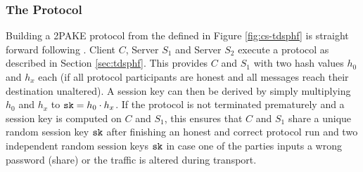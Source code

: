 \subsubsection{The Protocol}\label{sec:2pakeprotocol}
Building a 2PAKE protocol from the \TDSPHF defined in Figure \ref{fig:cs-tdsphf} is straight forward following \cite{KieferM14a}.
Client $C$, Server $S_1$ and Server $S_2$ execute a \TDSPHF protocol as described in Section \ref{sec:tdsphf}.
This provides $C$ and $S_1$ with two hash values $h_0$ and $h_x$ each (if all protocol participants are honest and all messages reach their destination unaltered).
A session key can then be derived by simply multiplying $h_0$ and $h_x$ to $\mathtt{sk}=h_0\cdot h_x$.
If the protocol is not terminated prematurely and a session key is computed on $C$ and $S_1$, this ensures that $C$ and $S_1$ share a unique random session key $\mathtt{sk}$ after finishing an honest and correct protocol run and two independent random session keys $\mathtt{sk}$ in case one of the parties inputs a wrong password (share) or the traffic is altered during transport.

